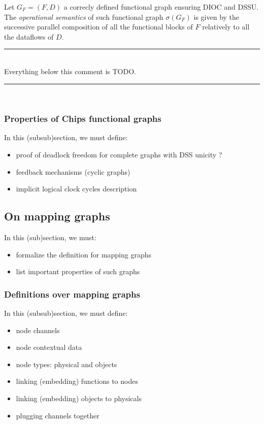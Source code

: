 \documentclass[runningheads]{llncs}
\newcommand{\myrule}{\par\noindent\rule[-1pt]{0.5\textwidth}{0.4pt}\\}
\begin{document}
\begin{definition}
    Let $G_F = (F, D)$ a correcly defined functional graph ensuring DIOC and DSSU. The \emph{operational semantics} of such functional graph $\sigma(G_F)$ is given by the successive parallel composition of all the functional blocks of $F$ relatively to all the dataflows of $D$.
\end{definition}


\myrule
Everything below this comment is TODO.
\myrule
\subsubsection{Properties of Chips functional graphs}

In this (subsub)section, we must define:
\begin{itemize}
    \item proof of deadlock freedom for complete graphs with DSS unicity ? 
    \item feedback mechanisms (cyclic graphs)
    \item implicit logical clock cycles description
\end{itemize}

\subsection{On mapping graphs}

In this (sub)section, we must:
\begin{itemize}
    \item formalize the definition for mapping graphs
    \item list important properties of such graphs 
\end{itemize}

\subsubsection{Definitions over mapping graphs}

In this (subsub)section, we must define:
\begin{itemize}
    \item node channels
    \item node contextual data
    \item node types: physical and objects
    \item linking (embedding) functions to nodes
    \item linking (embedding) objects to physicals
    \item plugging channels together
\end{itemize}
\end{document}
